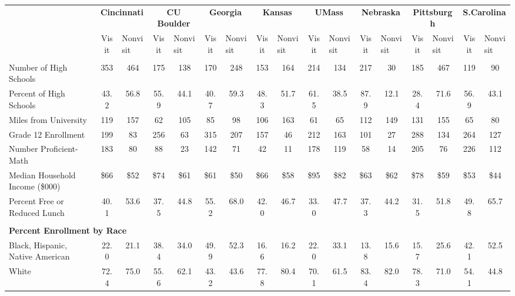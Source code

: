 \begin{tabular*}{\linewidth}{@{\extracolsep{\fill} } lcccccccccccccccc}%
&\multicolumn{2}{c}{\bfseries Cincinnati}&\multicolumn{2}{c}{\bfseries CU Boulder}&\multicolumn{2}{c}{\bfseries Georgia}&\multicolumn{2}{c}{\bfseries Kansas}&\multicolumn{2}{c}{\bfseries UMass}&\multicolumn{2}{c}{\bfseries Nebraska}&\multicolumn{2}{c}{\bfseries Pittsburgh}&\multicolumn{2}{c}{\bfseries S.Carolina}\\%
&Visit&\multicolumn{1}{l}{Nonvisit}&Visit&\multicolumn{1}{l}{Nonvisit}&Visit&\multicolumn{1}{l}{Nonvisit}&Visit&\multicolumn{1}{l}{Nonvisit}&Visit&\multicolumn{1}{l}{Nonvisit}&Visit&\multicolumn{1}{l}{Nonvisit}&Visit&\multicolumn{1}{l}{Nonvisit}&Visit&\multicolumn{1}{l}{Nonvisit}\\%
\hline%
&&&&&&&&&&&&&&&&\\%
\hspace{0cm}Number of High Schools&353&464&175&138&170&248&153&164&214&134&217&30&185&467&119&90\\%
Percent of High Schools&43.2&56.8&55.9&44.1&40.7&59.3&48.3&51.7&61.5&38.5&87.9&12.1&28.4&71.6&56.9&43.1\\%
\hspace{0cm}Miles from University&119&157&62&105&85&98&106&163&61&65&112&149&131&155&65&80\\%
\hspace{0cm}Grade 12 Enrollment&199&83&256&63&315&207&157&46&212&163&101&27&288&134&264&127\\%
\hspace{0cm}Number Proficient{-}Math&183&80&88&23&142&71&42&11&178&119&58&14&205&76&226&112\\%
\hspace{0cm}Median Household Income (\$000)&\$66&\$52&\$74&\$61&\$61&\$50&\$66&\$58&\$95&\$82&\$63&\$62&\$78&\$59&\$53&\$44\\%
\hspace{0cm}Percent Free or Reduced Lunch&40.1&53.6&37.5&44.8&55.2&68.0&42.0&46.7&33.0&47.7&37.3&44.2&31.5&51.8&49.8&65.7\\%
&&&&&&&&&&&&&&&&\\%
\multicolumn{17}{l}{\bfseries Percent Enrollment by Race}\\%
\hspace{0.2cm}Black, Hispanic, Native American&22.0&21.1&38.4&34.0&49.9&52.3&16.6&16.2&22.0&33.1&13.8&15.6&15.7&25.6&42.1&52.5\\%
\hspace{0.2cm}White&72.4&75.0&55.6&62.1&43.2&43.6&77.8&80.4&70.1&61.5&83.4&82.0&78.3&71.0&54.1&44.8\\%

\end{tabular*}
